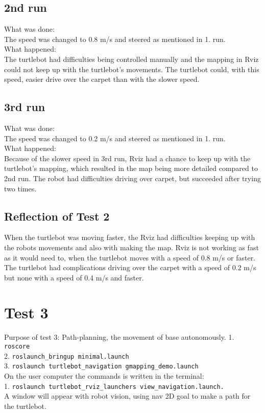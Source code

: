 \subsection{2nd run}
What was done:\\
The speed was changed to 0.8 m/s and steered as mentioned in 1. run.\\
What happened:\\
The turtlebot had difficulties being controlled manually and the mapping in Rviz could not keep up with the turtlebot's movements. The turtlebot could, with this speed, easier drive over the carpet than with the slower speed.

\subsection{3rd run}
What was done:\\
The speed was changed to 0.2 m/s and steered as mentioned in 1. run.\\
What happened:\\
Because of the slower speed in 3rd run, Rviz had a chance to keep up with the turtlebot's mapping, which resulted in the map being more detailed compared to 2nd run. The robot had difficulties driving over carpet, but succeeded after trying two times.

\subsection{Reflection of Test 2}
When the turtlebot was moving faster, the Rviz had difficulties keeping up with the robots movements and also with making the map. Rviz is not working as fast as it would need to, when the turtlebot moves with a speed of 0.8 m/s or faster. The turtlebot had complications driving over the carpet with a speed of 0.2 m/s but none with a speed of 0.4 m/s and faster.

%
%

\section{Test 3}
Purpose of test 3: Path-planning, the movement of base autonomously. 
1. \texttt{roscore}\\
2. \texttt{roslaunch\_bringup minimal.launch}\\
3. \texttt{roslaunch turtlebot\_navigation gmapping\_demo.launch}\\
On the user computer the commands is written in the terminal:\\
1. \texttt{roslaunch turtlebot\_rviz\_launchers view\_navigation.launch.}\\
A window will appear with robot vision, using nav 2D goal to make a path for the turtlebot.\\

